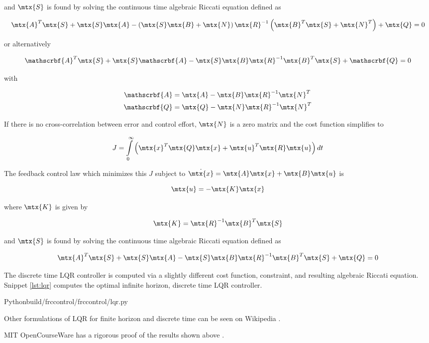 and $\mtx{S}$ is found by solving the continuous time algebraic Riccati equation
defined as

\begin{equation*}
  \mtx{A}^T\mtx{S} + \mtx{S}\mtx{A} - \left(\mtx{S}\mtx{B} +
    \mtx{N}\right) \mtx{R}^{-1} \left(\mtx{B}^T\mtx{S} + \mtx{N}^T\right) +
    \mtx{Q} = 0
\end{equation*}

or alternatively

\begin{equation*}
  \mathscrbf{A}^T\mtx{S} + \mtx{S}\mathscrbf{A} -
    \mtx{S}\mtx{B}\mtx{R}^{-1}\mtx{B}^T\mtx{S} + \mathscrbf{Q} = 0
\end{equation*}

with

\begin{align*}
  \mathscrbf{A} &= \mtx{A} - \mtx{B}\mtx{R}^{-1}\mtx{N}^T \\
  \mathscrbf{Q} &= \mtx{Q} - \mtx{N}\mtx{R}^{-1}\mtx{N}^T
\end{align*}

If there is no cross-correlation between \gls{error} and \gls{control effort},
$\mtx{N}$ is a zero matrix and the cost function simplifies to

\begin{equation*}
  J = \int\limits_0^\infty
    \left(\mtx{x}^T\mtx{Q}\mtx{x} + \mtx{u}^T\mtx{R}\mtx{u}\right) dt
\end{equation*}

The feedback \gls{control law} which minimizes this $J$ subject to
$\dot{\mtx{x}} = \mtx{A}\mtx{x} + \mtx{B}\mtx{u}$ is

\begin{equation*}
  \mtx{u} = -\mtx{K}\mtx{x}
\end{equation*}

where $\mtx{K}$ is given by

\begin{equation*}
  \mtx{K} = \mtx{R}^{-1}\mtx{B}^T\mtx{S}
\end{equation*}

and $\mtx{S}$ is found by solving the continuous time algebraic Riccati equation
defined as

\begin{equation*}
  \mtx{A}^T\mtx{S} + \mtx{S}\mtx{A} -
    \mtx{S}\mtx{B}\mtx{R}^{-1}\mtx{B}^T\mtx{S} + \mtx{Q} = 0
\end{equation*}

The discrete time LQR \gls{controller} is computed via a slightly different cost
function, constraint, and resulting algebraic Riccati equation. Snippet
\ref{lst:lqr} computes the optimal infinite horizon, discrete time LQR
\gls{controller}.

\begin{code}{Python}{build/frccontrol/frccontrol/lqr.py}
  \caption{Infinite horizon, discrete time LQR computation in Python}
  \label{lst:lqr}
\end{code}

Other formulations of LQR for finite horizon and discrete time can be seen on
Wikipedia \cite{bib:wiki_lqr}.

MIT OpenCourseWare has a rigorous proof of the results shown above
\cite{bib:lqr_derivs}.

